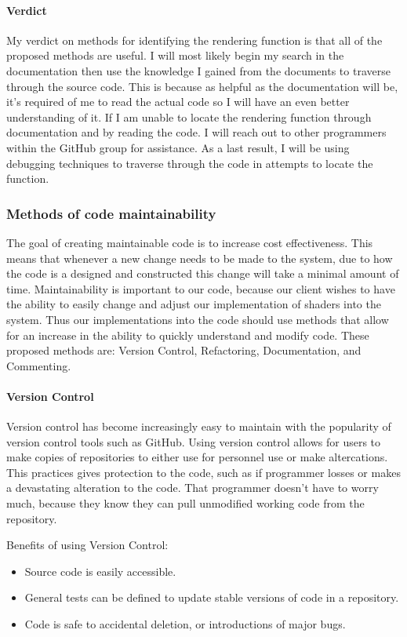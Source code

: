 \paragraph{Verdict}
My verdict on methods for identifying the rendering function is that all of the proposed methods are useful.
I will most likely begin my search in the documentation then use the knowledge I gained from the documents to traverse through the source code.
This is because as helpful as the documentation will be, it's required of me to read the actual code so I will have an even better understanding of it.
If I am unable to locate the rendering function through documentation and by reading the code.
I will reach out to other programmers within the GitHub group for assistance.
As a last result, I will be using debugging techniques to traverse through the code in attempts to locate the function.

\newpage
\subsubsection{Methods of code maintainability}
The goal of creating maintainable code is to increase cost effectiveness.
This means that whenever a new change needs to be made to the system, due to how the code is a designed and constructed this change will take a minimal amount of time.\cite{maintainability}
Maintainability is important to our code, because our client wishes to have the ability to easily change and adjust our implementation of shaders into the system.
Thus our implementations into the code should use methods that allow for an increase in the ability to quickly understand and modify code.
These proposed methods are: Version Control, Refactoring, Documentation, and Commenting.

\paragraph{Version Control}
Version control has become increasingly easy to maintain with the popularity of version control tools such as GitHub.
Using version control allows for users to make copies of repositories to either use for personnel use or make altercations.
This practices gives protection to the code, such as if programmer losses or makes a devastating alteration to the code.
That programmer doesn't have to worry much, because they know they can pull unmodified working code from the repository.\cite{version}

Benefits of using Version Control:
\begin{itemize}
\item Source code is easily accessible.
\item General tests can be defined to update stable versions of code in a repository.
\item Code is safe to accidental deletion, or introductions of major bugs.
\end{itemize}

